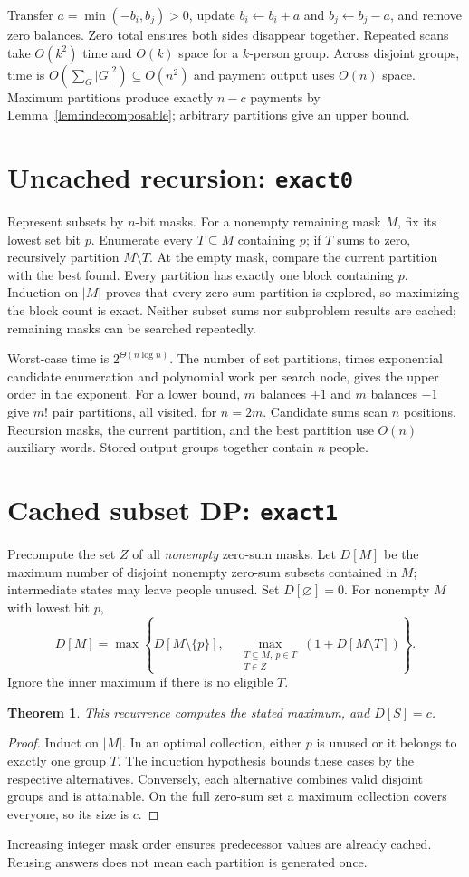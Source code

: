 \documentclass[11pt]{article}
\newtheorem{theorem}{Theorem}[section]
\begin{document}
Transfer $a=\min(-b_i,b_j)>0$, update $b_i\leftarrow b_i+a$ and
$b_j\leftarrow b_j-a$, and remove zero balances. Zero total ensures both
sides disappear together. Repeated scans take $O(k^2)$ time and $O(k)$
space for a $k$-person group. Across disjoint groups, time is
$O(\sum_G|G|^2)\subseteq O(n^2)$ and payment output uses $O(n)$ space.
Maximum partitions produce exactly $n-c$ payments by
Lemma~\ref{lem:indecomposable}; arbitrary partitions give an upper bound.

\section{Uncached recursion: \texttt{exact0}}\label{sec:exact0}
Represent subsets by $n$-bit masks. For a nonempty remaining mask $M$,
fix its lowest set bit $p$. Enumerate every $T\subseteq M$ containing
$p$; if $T$ sums to zero, recursively partition $M\setminus T$.
At the empty mask, compare the current partition with the best found.
Every partition has exactly one block containing $p$. Induction on
$|M|$ proves that every zero-sum partition is explored, so maximizing
the block count is exact. Neither subset sums nor subproblem results
are cached; remaining masks can be searched repeatedly.

Worst-case time is $2^{\Theta(n\log n)}$. The number of set partitions,
times exponential candidate enumeration and polynomial work per search
node, gives the upper order in the exponent. For a lower bound, $m$
balances $+1$ and $m$ balances $-1$ give $m!$ pair partitions, all
visited, for $n=2m$. Candidate sums scan $n$ positions. Recursion masks,
the current partition, and the best partition use $O(n)$ auxiliary words.
Stored output groups together contain $n$ people.

\section{Cached subset DP: \texttt{exact1}}\label{sec:exact1}
Precompute the set $Z$ of all \emph{nonempty} zero-sum masks. Let $D[M]$
be the maximum number of disjoint nonempty zero-sum subsets contained
in $M$; intermediate states may leave people unused. Set
$D[\varnothing]=0$. For nonempty $M$ with lowest bit $p$,
\[
 D[M]=\max\left\{D[M\setminus\{p\}],\quad
 \max_{\substack{T\subseteq M,\ p\in T\\T\in Z}}
       (1+D[M\setminus T])\right\}.
\]
Ignore the inner maximum if there is no eligible $T$.
\begin{theorem}\label{thm:exact1}
This recurrence computes the stated maximum, and $D[S]=c$.
\end{theorem}
\begin{proof}
Induct on $|M|$. In an optimal collection, either $p$ is unused or it
belongs to exactly one group $T$. The induction hypothesis bounds these
cases by the respective alternatives. Conversely, each alternative
combines valid disjoint groups and is attainable. On the full zero-sum
set a maximum collection covers everyone, so its size is $c$.
\end{proof}
Increasing integer mask order ensures predecessor values are already
cached. Reusing answers does not mean each partition is generated once.
\end{document}

